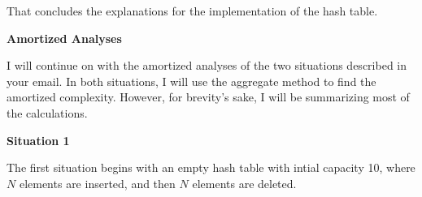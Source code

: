 \documentclass[11pt]{article}
\begin{document}
    That concludes the explanations for the implementation of the hash table.
    
    \medskip

    \textbf{Amortized Analyses}
    
    I will continue on with the amortized analyses of the two situations described in your email. In both situations, I will use the aggregate method to find the amortized complexity. However, for brevity's sake, I will be summarizing most of the calculations.

    \medskip

    \textbf{Situation 1}

    The first situation begins with an empty hash table with intial capacity 10, where \(N\) elements are inserted, and then \(N\) elements are deleted.
\end{document}
